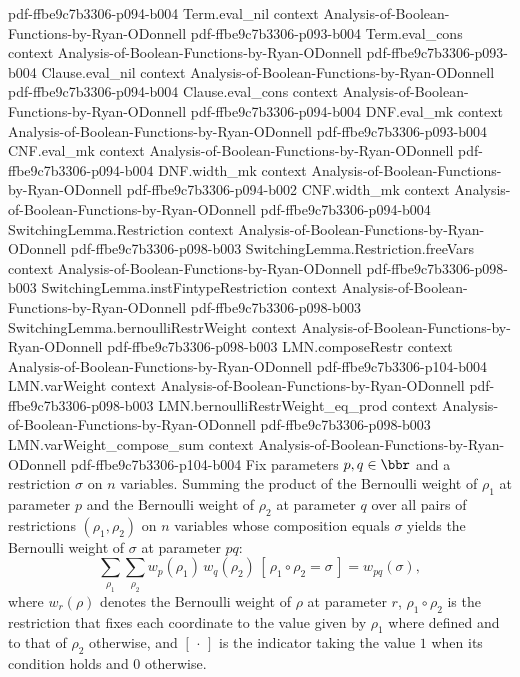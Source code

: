 \begin{lemma}
  {pdf-ffbe9c7b3306-p094-b004}
\proofstep
  {Term.eval_nil}
  {context}
  {Analysis-of-Boolean-Functions-by-Ryan-ODonnell}
  {pdf-ffbe9c7b3306-p093-b004}
\proofstep
  {Term.eval_cons}
  {context}
  {Analysis-of-Boolean-Functions-by-Ryan-ODonnell}
  {pdf-ffbe9c7b3306-p093-b004}
\proofstep
  {Clause.eval_nil}
  {context}
  {Analysis-of-Boolean-Functions-by-Ryan-ODonnell}
  {pdf-ffbe9c7b3306-p094-b004}
\proofstep
  {Clause.eval_cons}
  {context}
  {Analysis-of-Boolean-Functions-by-Ryan-ODonnell}
  {pdf-ffbe9c7b3306-p094-b004}
\proofstep
  {DNF.eval_mk}
  {context}
  {Analysis-of-Boolean-Functions-by-Ryan-ODonnell}
  {pdf-ffbe9c7b3306-p093-b004}
\proofstep
  {CNF.eval_mk}
  {context}
  {Analysis-of-Boolean-Functions-by-Ryan-ODonnell}
  {pdf-ffbe9c7b3306-p094-b004}
\proofstep
  {DNF.width_mk}
  {context}
  {Analysis-of-Boolean-Functions-by-Ryan-ODonnell}
  {pdf-ffbe9c7b3306-p094-b002}
\proofstep
  {CNF.width_mk}
  {context}
  {Analysis-of-Boolean-Functions-by-Ryan-ODonnell}
  {pdf-ffbe9c7b3306-p094-b004}
\proofstep
  {SwitchingLemma.Restriction}
  {context}
  {Analysis-of-Boolean-Functions-by-Ryan-ODonnell}
  {pdf-ffbe9c7b3306-p098-b003}
\proofstep
  {SwitchingLemma.Restriction.freeVars}
  {context}
  {Analysis-of-Boolean-Functions-by-Ryan-ODonnell}
  {pdf-ffbe9c7b3306-p098-b003}
\proofstep
  {SwitchingLemma.instFintypeRestriction}
  {context}
  {Analysis-of-Boolean-Functions-by-Ryan-ODonnell}
  {pdf-ffbe9c7b3306-p098-b003}
\proofstep
  {SwitchingLemma.bernoulliRestrWeight}
  {context}
  {Analysis-of-Boolean-Functions-by-Ryan-ODonnell}
  {pdf-ffbe9c7b3306-p098-b003}
\proofstep
  {LMN.composeRestr}
  {context}
  {Analysis-of-Boolean-Functions-by-Ryan-ODonnell}
  {pdf-ffbe9c7b3306-p104-b004}
\proofstep
  {LMN.varWeight}
  {context}
  {Analysis-of-Boolean-Functions-by-Ryan-ODonnell}
  {pdf-ffbe9c7b3306-p098-b003}
\proofstep
  {LMN.bernoulliRestrWeight_eq_prod}
  {context}
  {Analysis-of-Boolean-Functions-by-Ryan-ODonnell}
  {pdf-ffbe9c7b3306-p098-b003}
\proofstep
  {LMN.varWeight_compose_sum}
  {context}
  {Analysis-of-Boolean-Functions-by-Ryan-ODonnell}
  {pdf-ffbe9c7b3306-p104-b004}
Fix parameters $p, q \in \bbr$ and a restriction $\sigma$ on $n$ variables. Summing the
product of the Bernoulli weight of $\rho_1$ at parameter $p$ and the Bernoulli weight of
$\rho_2$ at parameter $q$ over all pairs of restrictions $(\rho_1, \rho_2)$ on $n$
variables whose composition equals $\sigma$ yields the Bernoulli weight of $\sigma$ at
parameter $pq$:
\[
  \sum_{\rho_1}\sum_{\rho_2}
    w_p(\rho_1)\, w_q(\rho_2)\,
    [\,\rho_1 \circ \rho_2 = \sigma\,]
  = w_{pq}(\sigma),
\]
where $w_r(\rho)$ denotes the Bernoulli weight of $\rho$ at parameter $r$, $\rho_1 \circ
\rho_2$ is the restriction that fixes each coordinate to the value given by $\rho_1$
where defined and to that of $\rho_2$ otherwise, and $[\,\cdot\,]$ is the indicator
taking the value $1$ when its condition holds and $0$ otherwise.
\end{lemma}

